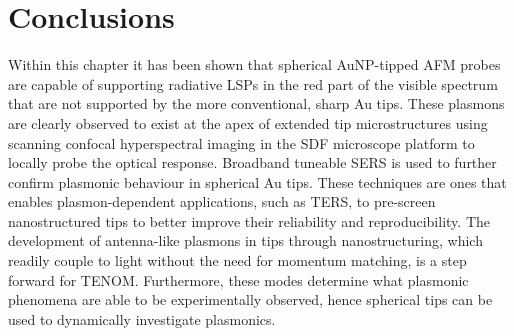 \documentclass[12pt, a4paper, oneside]{book}
\begin{document}
\section{Conclusions}


Within this chapter it has been shown that spherical AuNP-tipped AFM probes are capable of supporting radiative LSPs in the red part of the visible spectrum that are not supported by the more conventional, sharp Au tips. These plasmons are clearly observed to exist at the apex of extended tip microstructures using scanning confocal hyperspectral imaging in the SDF microscope platform to locally probe the optical response. Broadband tuneable SERS is used to further confirm plasmonic behaviour in spherical Au tips. These techniques are ones that enables plasmon-dependent applications, such as TERS, to pre-screen nanostructured tips to better improve their reliability and reproducibility. The development of antenna-like plasmons in tips through nanostructuring, which readily couple to light without the need for momentum matching, is a step forward for TENOM. Furthermore, these modes determine what plasmonic phenomena are able to be experimentally observed, hence spherical tips can be used to dynamically investigate plasmonics.

\ifstandalone
\begin{singlespace}
\fontsize{8pt}{1em}\selectfont
\printbibliography[notcategory=fullcited]
\end{singlespace}
\fi
\end{document}
